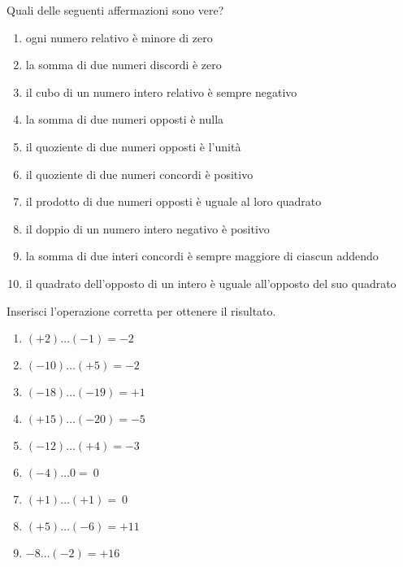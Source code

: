 \begin{esercizio}
Quali delle seguenti affermazioni sono vere?
\TabPositions{12cm}
\begin{enumerate}[noitemsep, label=(\alph*)]
 \item ogni numero relativo è minore di zero \tab\boxV\quad\boxF
 \item la somma di due numeri discordi è zero \tab\boxV\quad\boxF
 \item il cubo di un numero intero relativo è sempre negativo 
\tab\boxV\quad\boxF
 \item la somma di due numeri opposti è nulla \tab\boxV\quad\boxF
 \item il quoziente di due numeri opposti è l'unità \tab\boxV\quad\boxF
 \item il quoziente di due numeri concordi è positivo \tab\boxV\quad\boxF
 \item il prodotto di due numeri opposti è uguale al loro quadrato 
\tab\boxV\quad\boxF
 \item il doppio di un numero intero negativo è positivo \tab\boxV\quad\boxF
 \item la somma di due interi concordi è sempre maggiore di ciascun addendo 
\tab\boxV\quad\boxF
 \item il quadrato dell'opposto di un intero è uguale all'opposto del suo 
quadrato \tab\boxV\quad\boxF
\end{enumerate}
\end{esercizio}

\begin{esercizio}
Inserisci l'operazione corretta per ottenere il risultato.
 \begin{multicols}{3}
 \begin{enumerate}[noitemsep, label=(\alph*)]
 \item \((+2)\ldots(-1) = -2\)
 \item \((-10)\ldots(+5) = -2\)
 \item \((-18)\ldots(-19) = +1\)
 \item \((+15)\ldots(-20) = -5\)
 \item \((-12)\ldots(+4) = -3\)
 \item \((-4)\ldots0 =~0\)
 \item \((+1)\ldots(+1) =~0\)
 \item \((+5)\ldots(-6) = +11\)
 \item \(-8\ldots(-2) = +16\)
 \end{enumerate}
 \end{multicols}
\end{esercizio}


